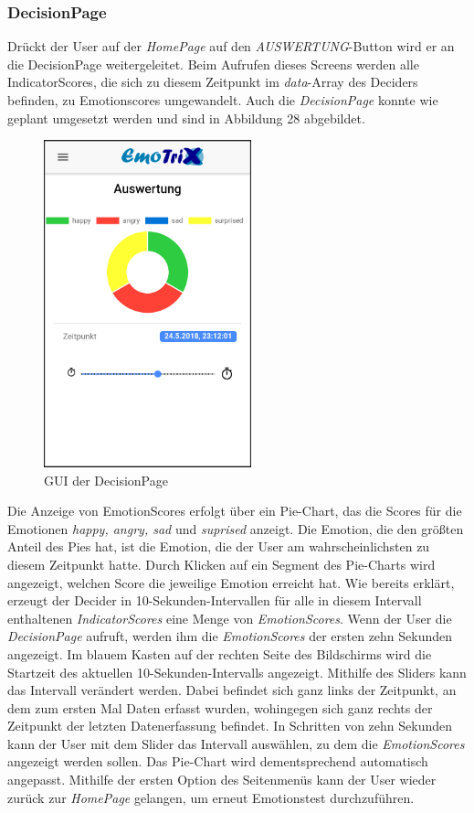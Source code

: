 \subsubsection{DecisionPage}
Drückt der User auf der \textit{HomePage} auf den \textit{AUSWERTUNG}-Button wird er an die DecisionPage weitergeleitet. Beim Aufrufen dieses Screens werden alle IndicatorScores, die sich zu diesem Zeitpunkt im \textit{data}-Array des Deciders befinden, zu Emotionscores umgewandelt. Auch die \textit{DecisionPage} konnte wie geplant umgesetzt werden und sind in Abbildung 28 abgebildet. \newline 
\begin{figure}[h]
	\centering
	\includegraphics[width=6cm]{Bilder/decisionpage.png}
	\caption[GUI der DecisionPage]{GUI der DecisionPage}
\end{figure}%
\newline
Die Anzeige von EmotionScores erfolgt über ein Pie-Chart, das die Scores für die Emotionen \textit{happy, angry, sad} und \textit{suprised} anzeigt. Die Emotion, die den größten Anteil des Pies hat, ist die Emotion, die der User am wahrscheinlichsten zu diesem Zeitpunkt hatte. Durch Klicken auf ein Segment des Pie-Charts wird angezeigt, welchen Score die jeweilige Emotion erreicht hat.\newline
Wie bereits erklärt, erzeugt der Decider in 10-Sekunden-Intervallen für alle in diesem Intervall enthaltenen \textit{IndicatorScores} eine Menge von \textit{EmotionScores}. Wenn der User die \textit{DecisionPage} aufruft, werden ihm die \textit{EmotionScores} der ersten zehn Sekunden angezeigt. Im blauem Kasten auf der rechten Seite des Bildschirms wird die Startzeit des aktuellen 10-Sekunden-Intervalls angezeigt. Mithilfe des Sliders kann das Intervall verändert werden. Dabei befindet sich ganz links der Zeitpunkt, an dem zum ersten Mal Daten erfasst wurden, wohingegen sich ganz rechts der Zeitpunkt der letzten Datenerfassung befindet. In Schritten von zehn Sekunden kann der User mit dem Slider das Intervall auswählen, zu dem die \textit{EmotionScores} angezeigt werden sollen. Das Pie-Chart wird dementsprechend automatisch angepasst. \newline
Mithilfe der ersten Option des Seitenmenüs kann der User wieder zurück zur \textit{HomePage} gelangen, um erneut Emotionstest durchzuführen. 
